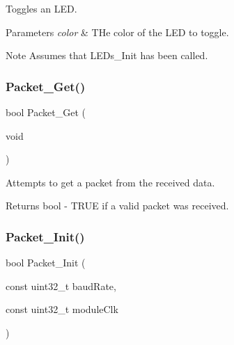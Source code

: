 Toggles an L\+ED. 


\begin{DoxyParams}{Parameters}
{\em color} & T\+He color of the L\+ED to toggle. \\
\hline
\end{DoxyParams}
\begin{DoxyNote}{Note}
Assumes that L\+E\+Ds\+\_\+\+Init has been called. 
\end{DoxyNote}
\mbox{\label{group__main__module_gac58a17928cd5e556e1567b2fde9f88f0}} 
\subsubsection{\texorpdfstring{Packet\+\_\+\+Get()}{Packet\_Get()}}
{\footnotesize\ttfamily bool Packet\+\_\+\+Get (\begin{DoxyParamCaption}\item[{void}]{ }\end{DoxyParamCaption})}



Attempts to get a packet from the received data. 

\begin{DoxyReturn}{Returns}
bool -\/ T\+R\+UE if a valid packet was received. 
\end{DoxyReturn}
\mbox{\label{group__main__module_ga414aa3f521fdfd6e4586d98a946b6ab2}} 
\subsubsection{\texorpdfstring{Packet\+\_\+\+Init()}{Packet\_Init()}}
{\footnotesize\ttfamily bool Packet\+\_\+\+Init (\begin{DoxyParamCaption}\item[{const uint32\+\_\+t}]{baud\+Rate,  }\item[{const uint32\+\_\+t}]{module\+Clk }\end{DoxyParamCaption})}



